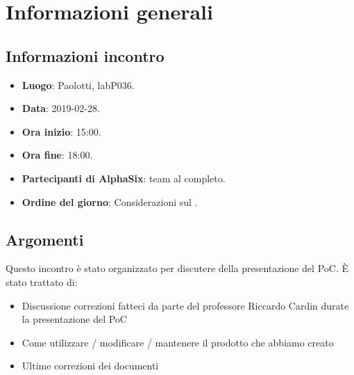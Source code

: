 \newcommand{\documento}{\VI}
\newcommand{\nomedocumentofisico}{VI\_2019-02-28.pdf}
\newcommand{\redazione}{\MM}
\newcommand{\verifica}{\CV}
\newcommand{\approvazione}{\SG}
\newcommand{\versione}{1.0.0}
\newcommand{\uso}{Interno}
\newcommand{\destinateTo}{\gruppo}
\newcommand{\datacreazione}{01 marzo 2019}
\newcommand{\datamodifica}{03 marzo 2019}
\newcommand{\stato}{Approvato}

\def\TABELLE{false}	%
\def\FIGURE{false} 	%






    

    	
    
    \section{Informazioni generali}
		\subsection{Informazioni incontro}
			\begin{itemize}
				\item \textbf{Luogo}: Paolotti, labP036.
				\item \textbf{Data}: 2019-02-28.
				\item \textbf{Ora inizio}: 15:00.
				\item \textbf{Ora fine}: 18:00.
				\item \textbf{Partecipanti di AlphaSix}: team al completo.
				\item \textbf{Ordine del giorno}: Considerazioni sul .
			\end{itemize}

        \subsection{Argomenti}
            Questo incontro è stato organizzato per discutere della presentazione del PoC. È stato trattato di:
            \begin{itemize}
                \item Discussione correzioni fatteci da parte del professore Riccardo Cardin durate la presentazione del PoC
                \item Come utilizzare / modificare / mantenere il prodotto che abbiamo creato
                \item Ultime correzioni dei documenti
            \end{itemize}

